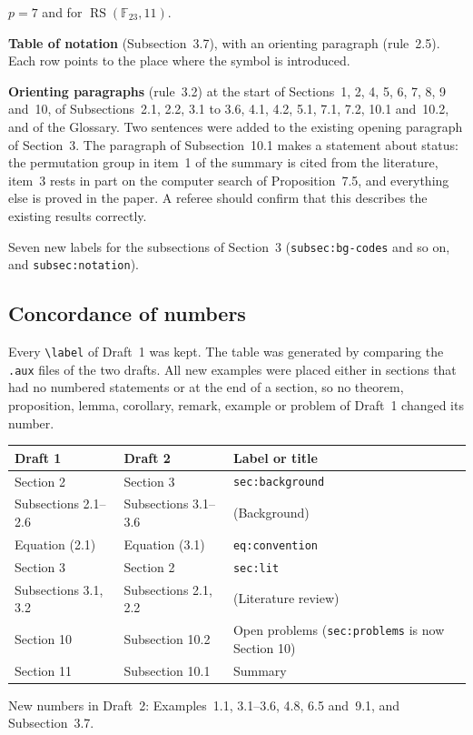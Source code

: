 \documentclass[12pt,letterpaper]{article}
\newcommand{\F}{\mathbb{F}}
\newcommand{\RS}{\operatorname{RS}}
\begin{document}
\begin{description}
$p=7$ and for $\RS(\F_{23},11)$.
\item[N11.] \textbf{Table of notation} (Subsection~3.7), with an orienting
paragraph (rule~2.5). Each row points to the place where the symbol is
introduced.
\item[N12.] \textbf{Orienting paragraphs} (rule~3.2) at the start of
Sections~1, 2, 4, 5, 6, 7, 8, 9 and~10, of Subsections~2.1, 2.2, 3.1 to 3.6, 4.1,
4.2, 5.1, 7.1, 7.2, 10.1 and~10.2, and of the Glossary. Two sentences were added
to the existing opening paragraph of Section~3. The paragraph of
Subsection~10.1 makes a statement about status: the permutation group in item~1
of the summary is cited from the literature, item~3 rests in part on the computer
search of Proposition~7.5, and everything else is proved in the paper. A referee
should confirm that this describes the existing results correctly.
\item[N13.] Seven new labels for the subsections of Section~3
(\texttt{subsec:bg-codes} and so on, and \texttt{subsec:notation}).
\end{description}

\subsection{Concordance of numbers}\label{sec:conc}
Every \verb|\label| of Draft~1 was kept. The table was generated by comparing
the \texttt{.aux} files of the two drafts. All new examples were placed either
in sections that had no numbered statements or at the end of a section, so no
theorem, proposition, lemma, corollary, remark, example or problem of Draft~1
changed its number.
\begin{center}\small
\begin{tabular}{@{}lll@{}}
\toprule
Draft 1 & Draft 2 & Label or title\\
\midrule
Section 2 & Section 3 & \texttt{sec:background}\\
Subsections 2.1--2.6 & Subsections 3.1--3.6 & (Background)\\
Equation (2.1) & Equation (3.1) & \texttt{eq:convention}\\
Section 3 & Section 2 & \texttt{sec:lit}\\
Subsections 3.1, 3.2 & Subsections 2.1, 2.2 & (Literature review)\\
Section 10 & Subsection 10.2 & Open problems (\texttt{sec:problems} is now Section 10)\\
Section 11 & Subsection 10.1 & Summary\\
\bottomrule
\end{tabular}
\end{center}
New numbers in Draft~2: Examples~1.1, 3.1--3.6, 4.8, 6.5 and~9.1, and
Subsection~3.7.
\end{document}
